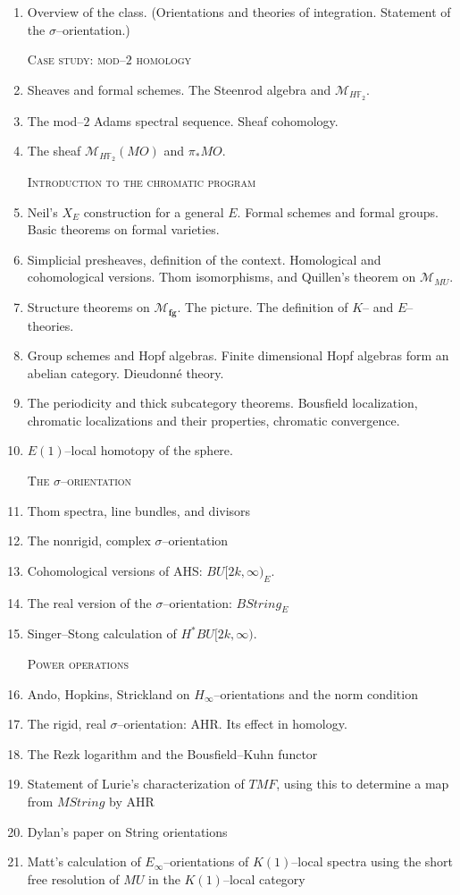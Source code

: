 \documentclass{article}
\newcommand{\F}{\mathbb F}
\newcommand{\<}{\langle}
\renewcommand{\>}{\rangle}
\newcommand{\context}[1]{\mathcal{M}_{#1}}
\newcommand{\moduli}[1]{\mathcal{M}_{\mathbf{#1}}}
\newcommand{\String}{\mathit{String}}
\newcommand{\TMF}{\mathit{TMF}}
\newcommand{\MU}{\mathit{MU}}
\begin{document}
\begin{enumerate}
\item Overview of the class. (Orientations and theories of integration. Statement of the $\sigma$--orientation.)

\textsc{Case study: mod--$2$ homology}
\item Sheaves and formal schemes. The Steenrod algebra and $\context{H\F_2}$.
\item The mod--$2$ Adams spectral sequence. Sheaf cohomology. 
\item The sheaf $\context{H\F_2}(MO)$ and $\pi_* MO$.

\textsc{Introduction to the chromatic program}

\item Neil's $X_E$ construction for a general $E$. Formal schemes and formal groups. Basic theorems on formal varieties.
\item Simplicial presheaves, definition of the context. Homological and cohomological versions. Thom isomorphisms, and Quillen's theorem on $\context{\MU}$.
\item Structure theorems on $\moduli{fg}$. The picture. The definition of $K$-- and $E$--theories.
\item Group schemes and Hopf algebras. Finite dimensional Hopf algebras form an abelian category. Dieudonn\'e theory.
\item The periodicity and thick subcategory theorems. Bousfield localization, chromatic localizations and their properties, chromatic convergence.
\item $E(1)$--local homotopy of the sphere.

\textsc{The $\sigma$--orientation}

\item Thom spectra, line bundles, and divisors
\item The nonrigid, complex $\sigma$--orientation
\item Cohomological versions of AHS: $BU[2k, \infty)_E$.
\item The real version of the $\sigma$--orientation: $B\String_E$
\item Singer--Stong calculation of $H^* BU[2k, \infty)$.

\textsc{Power operations}

\item Ando, Hopkins, Strickland on $H_\infty$--orientations and the norm condition
\item The rigid, real $\sigma$--orientation: AHR. Its effect in homology.
\item The Rezk logarithm and the Bousfield--Kuhn functor
\item Statement of Lurie's characterization of $\TMF$, using this to determine a map from $M\String$ by AHR
\item Dylan's paper on String orientations
\item Matt's calculation of $E_\infty$--orientations of $K(1)$--local spectra using the short free resolution of $MU$ in the $K(1)$--local category


\end{enumerate}
\end{document}
